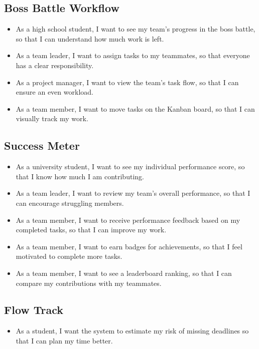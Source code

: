 \subsection{Boss Battle Workflow}
\begin{itemize}
    \item As a high school student, I want to see my team’s progress in the boss battle, so that I can understand how much work is left.
    \item As a team leader, I want to assign tasks to my teammates, so that everyone has a clear responsibility.
    \item As a project manager, I want to view the team’s task flow, so that I can ensure an even workload.
    \item As a team member, I want to move tasks on the Kanban board, so that I can visually track my work.
\end{itemize}

\subsection{Success Meter}
\begin{itemize}
    \item As a university student, I want to see my individual performance score, so that I know how much I am contributing.
    \item As a team leader, I want to review my team’s overall performance, so that I can encourage struggling members.
    \item As a team member, I want to receive performance feedback based on my completed tasks, so that I can improve my work.
    \item As a team member, I want to earn badges for achievements, so that I feel motivated to complete more tasks.
    \item As a team member, I want to see a leaderboard ranking, so that I can compare my contributions with my teammates.
\end{itemize}

\subsection{Flow Track}
\begin{itemize}
    \item As a student, I want the system to estimate my risk of missing deadlines so that I can plan my time better.
\end{itemize}


